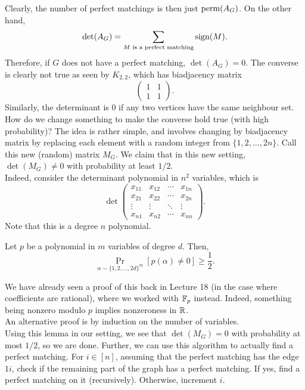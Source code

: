 			Clearly, the number of perfect matchings is then just $\operatorname{perm}(A_G)$. On the other hand,
			\[ \det(A_G) = \sum_{M \text{ is a perfect matching}} \operatorname{sign}(M). \]
			Therefore, if $G$ does not have a perfect matching, $\det(A_G) = 0$. The converse is clearly not true as seen by $K_{2,2}$, which has biadjacency matrix
			\[ \begin{pmatrix} 1 & 1 \\ 1 & 1 \end{pmatrix}. \]
			Similarly, the determinant is $0$ if any two vertices have the same neighbour set.\\
			How do we change something to make the converse hold true (with high probability)? The idea is rather simple, and involves changing by biadjacency matrix by replacing each element with a random integer from $\{1,2,\ldots,2n\}$. Call this new (random) matrix $M_G$. We claim that in this new setting, $\det(M_G) \ne 0$ with probability at least $1/2$.\\
			Indeed, consider the determinant polynomial in $n^2$ variables, which is
			\[ \det\begin{pmatrix} x_{11} & x_{12} & \cdots & x_{1n} \\ x_{21} & x_{22} & \cdots & x_{2n} \\ \vdots & \vdots & \ddots & \vdots \\ x_{n1} & x_{n2} & \cdots & x_{nn}  \end{pmatrix}. \]
			Note that this is a degree $n$ polynomial. 

			\begin{flem}
				Let $p$ be a polynomial in $m$ variables of degree $d$. Then,
				\[  \Pr_{\alpha \sim \{1,2,\ldots,2d\}^{m}} [p(\alpha) \ne 0] \ge \frac{1}{2}. \]
			\end{flem}
			We have already seen a proof of this back in Lecture 18 (in the case where coefficients are rational), where we worked with $\mathbb{F}_p$ instead. Indeed, something being nonzero modulo $p$ implies nonzeroness in $\mathbb{R}$.\\
			An alternative proof is by induction on the number of variables.\\

			Using this lemma in our setting, we see that $\det(M_G) = 0$ with probability at most $1/2$, so we are done. Further, we can use this algorithm to actually find a perfect matching. For $i \in [n]$, assuming that the perfect matching has the edge $1i$, check if the remaining part of the graph has a perfect matching. If yes, find a perfect matching on it (recursively). Otherwise, increment $i$.\\

